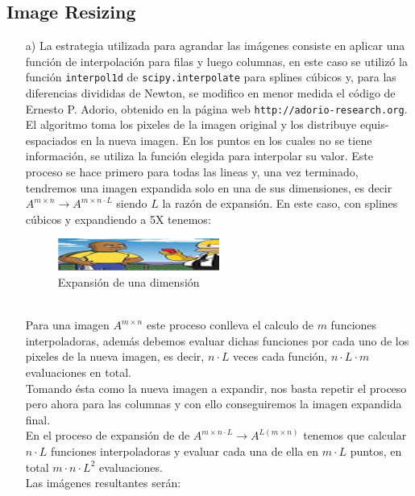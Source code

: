 \documentclass[spanish, fleqn]{article}
\begin{document}
	\subsection{Image Resizing}
	\begin{enumerate}
		\item[a)]
			La estrategia utilizada para agrandar las imágenes consiste en
			aplicar una función de interpolación para filas y luego columnas,
			en este caso se utilizó la función \texttt{interpol1d} de
			\texttt{scipy.interpolate} para splines cúbicos y, para las 
			diferencias divididas de Newton, se modifico en menor medida el
			código de Ernesto P. Adorio, obtenido en la página web 
			\texttt{http://adorio-research.org}. \\
			El algoritmo toma los pixeles de la imagen original y los
			distribuye equis-espaciados en la nueva imagen. En los puntos en
			los cuales no se tiene información, se utiliza la función elegida
			para interpolar su valor. Este proceso se hace primero para todas
			las lineas y, una vez terminado, tendremos una imagen expandida solo
			en una de sus dimensiones, es decir $A^{m\times n} \rightarrow
			A^{m\times n\cdot L}$ siendo $L$ la razón de expansión. En este
			caso, con splines cúbicos y expandiendo a 5X tenemos:
			\begin{figure}[ht!]
				\centering
				\includegraphics[width=200px]{Graficos/5xhomero_spline_media.png}
				\caption{Expansión de una dimensión}
			\end{figure}
			\\Para una imagen $A^{m\times n}$ este proceso conlleva el calculo
			de $m$ funciones interpoladoras, además debemos evaluar dichas
			funciones por cada uno de los pixeles de la nueva imagen, es decir,
			$n\cdot L$ veces cada función, $n\cdot L\cdot m$ evaluaciones en
			total.\\
			Tomando ésta como la nueva imagen a expandir, nos basta repetir el
			proceso pero ahora para las columnas y  con ello conseguiremos la 
			imagen expandida final.\\
			En el proceso de expansión de de $A^{m\times n\cdot L} \rightarrow 
			A^{L(m\times n)}$ tenemos que calcular $n\cdot L$
			funciones interpoladoras y evaluar cada una de ella en $m\cdot L$
			puntos, en total $m\cdot n\cdot L^{2}$ evaluaciones.\\
			\newpage
			Las imágenes resultantes serán:

\end{enumerate}
\end{document}
